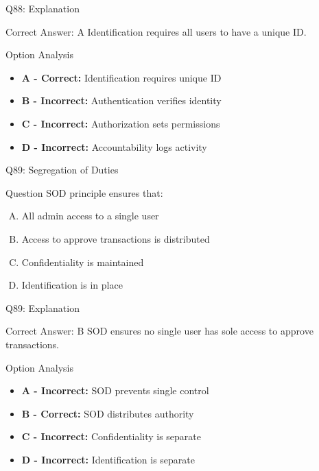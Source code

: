 \documentclass{beamer}
\begin{document}
	\begin{frame}{Q88: Explanation}
		\begin{block}{Correct Answer: A}
			Identification requires all users to have a unique ID.
		\end{block}
		\begin{block}{Option Analysis}
			\begin{itemize}
				\item \textbf{A - Correct:} Identification requires unique ID
				\item \textbf{B - Incorrect:} Authentication verifies identity
				\item \textbf{C - Incorrect:} Authorization sets permissions
				\item \textbf{D - Incorrect:} Accountability logs activity
			\end{itemize}
		\end{block}
	\end{frame}
	
	\begin{frame}{Q89: Segregation of Duties}
		\begin{block}{Question}
			SOD principle ensures that:
		\end{block}
		\begin{enumerate}[(A)]
			\item All admin access to a single user
			\item Access to approve transactions is distributed
			\item Confidentiality is maintained
			\item Identification is in place
		\end{enumerate}
	\end{frame}
	
	\begin{frame}{Q89: Explanation}
		\begin{block}{Correct Answer: B}
			SOD ensures no single user has sole access to approve transactions.
		\end{block}
		\begin{block}{Option Analysis}
			\begin{itemize}
				\item \textbf{A - Incorrect:} SOD prevents single control
				\item \textbf{B - Correct:} SOD distributes authority
				\item \textbf{C - Incorrect:} Confidentiality is separate
				\item \textbf{D - Incorrect:} Identification is separate
			\end{itemize}
		\end{block}
	\end{frame}
	
\end{document}
